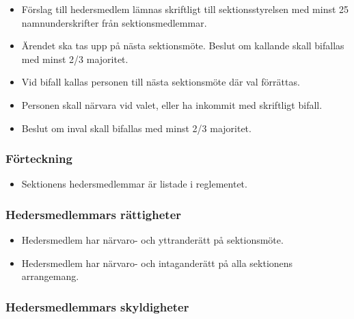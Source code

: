 \documentclass[11pt,a4paper]{article}
\begin{document}
\begin{itemize}

  \item Förslag till hedersmedlem lämnas skriftligt till sektionsstyrelsen med
  minst 25 namnunderskrifter från sektionsmedlemmar.

  \item Ärendet ska tas upp på nästa sektionsmöte. Beslut om kallande
  skall bifallas med minst 2/3 majoritet.

  \item Vid bifall kallas personen till nästa sektionsmöte där val
  förrättas.

  \item Personen skall närvara vid valet, eller ha inkommit med
  skriftligt bifall.

  \item Beslut om inval skall bifallas med minst 2/3 majoritet.

\end{itemize}


\subsubsection{Förteckning}

\begin{itemize}

  \item Sektionens hedersmedlemmar är listade i reglementet.

\end{itemize}

\subsubsection{Hedersmedlemmars rättigheter}

\begin{itemize}

   \item Hedersmedlem har närvaro- och yttranderätt på sektionsmöte.

   \item Hedersmedlem har närvaro- och intaganderätt på alla sektionens
arrangemang.

\end{itemize}

\subsubsection{Hedersmedlemmars skyldigheter}
\end{document}
